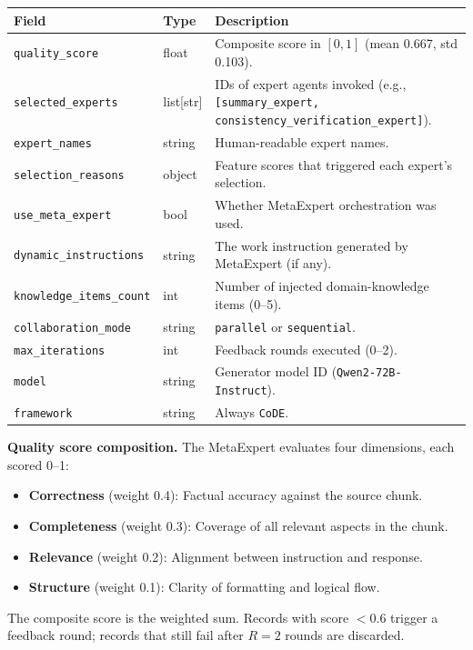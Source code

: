 \begin{table}[h]
\centering
\small
\begin{tabular}{@{}p{3.5cm}p{1.8cm}p{6cm}@{}}
\toprule
\textbf{Field} & \textbf{Type} & \textbf{Description} \\
\midrule
\texttt{quality\_score} & float & Composite score in $[0,1]$ (mean 0.667, std 0.103). \\
\texttt{selected\_experts} & list[str] & IDs of expert agents invoked (e.g., \texttt{[summary\_expert, consistency\_verification\_expert]}). \\
\texttt{expert\_names} & string & Human-readable expert names. \\
\texttt{selection\_reasons} & object & Feature scores that triggered each expert's selection. \\
\texttt{use\_meta\_expert} & bool & Whether MetaExpert orchestration was used. \\
\texttt{dynamic\_instructions} & string & The work instruction generated by MetaExpert (if any). \\
\texttt{knowledge\_items\_count} & int & Number of injected domain-knowledge items (0--5). \\
\texttt{collaboration\_mode} & string & \texttt{parallel} or \texttt{sequential}. \\
\texttt{max\_iterations} & int & Feedback rounds executed (0--2). \\
\texttt{model} & string & Generator model ID (\texttt{Qwen2-72B-Instruct}). \\
\texttt{framework} & string & Always \texttt{CoDE}. \\
\bottomrule
\end{tabular}
\end{table}

\noindent\textbf{Quality score composition.} The MetaExpert evaluates four dimensions, each scored 0--1:
\begin{itemize}[noitemsep]
    \item \textbf{Correctness} (weight 0.4): Factual accuracy against the source chunk.
    \item \textbf{Completeness} (weight 0.3): Coverage of all relevant aspects in the chunk.
    \item \textbf{Relevance} (weight 0.2): Alignment between instruction and response.
    \item \textbf{Structure} (weight 0.1): Clarity of formatting and logical flow.
\end{itemize}
The composite score is the weighted sum. Records with score $<0.6$ trigger a feedback round; records that still fail after $R=2$ rounds are discarded.
